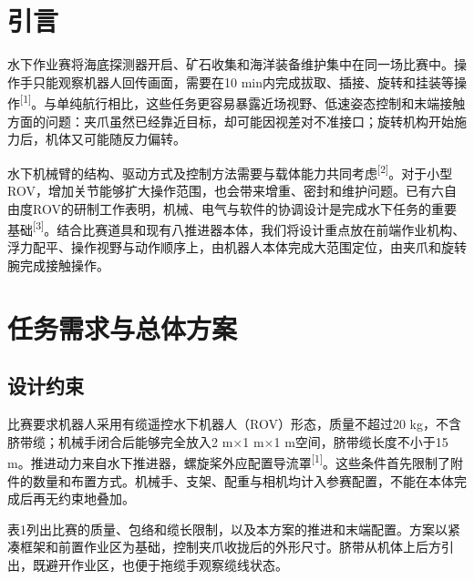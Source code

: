 \section{引言}

水下作业赛将海底探测器开启、矿石收集和海洋装备维护集中在同一场比赛中。操作手只能观察机器人回传画面，需要在10 min内完成拔取、插接、旋转和挂装等操作\textsuperscript{[1]}。与单纯航行相比，这些任务更容易暴露近场视野、低速姿态控制和末端接触方面的问题：夹爪虽然已经靠近目标，却可能因视差对不准接口；旋转机构开始施力后，机体又可能随反力偏转。\par

水下机械臂的结构、驱动方式及控制方法需要与载体能力共同考虑\textsuperscript{[2]}。对于小型ROV，增加关节能够扩大操作范围，也会带来增重、密封和维护问题。已有六自由度ROV的研制工作表明，机械、电气与软件的协调设计是完成水下任务的重要基础\textsuperscript{[3]}。结合比赛道具和现有八推进器本体，我们将设计重点放在前端作业机构、浮力配平、操作视野与动作顺序上，由机器人本体完成大范围定位，由夹爪和旋转腕完成接触操作。\par

\columnbreak
\section{任务需求与总体方案}

\subsection{设计约束}

比赛要求机器人采用有缆遥控水下机器人（ROV）形态，质量不超过20 kg，不含脐带缆；机械手闭合后能够完全放入2 m\(\times\)1 m\(\times\)1 m空间，脐带缆长度不小于15 m。推进动力来自水下推进器，螺旋桨外应配置导流罩\textsuperscript{[1]}。这些条件首先限制了附件的数量和布置方式。机械手、支架、配重与相机均计入参赛配置，不能在本体完成后再无约束地叠加。\par

表1列出比赛的质量、包络和缆长限制，以及本方案的推进和末端配置。方案以紧凑框架和前置作业区为基础，控制夹爪收拢后的外形尺寸。脐带从机体上后方引出，既避开作业区，也便于拖缆手观察缆线状态。\par

